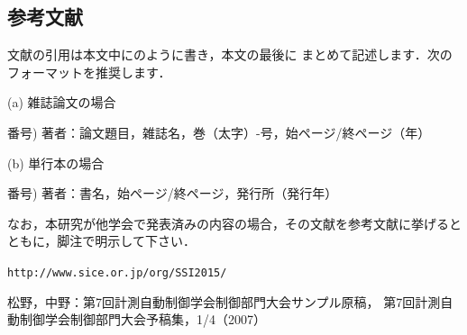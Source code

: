 \documentclass{jarticle}
\begin{document}
\subsection{参考文献}

文献の引用は本文中に\cite{大会ホームページ}のように書き，本文の最後に
まとめて記述します．次のフォーマットを推奨します．

\noindent
(a) 雑誌論文の場合

\noindent
番号)  著者：論文題目，雑誌名，巻（太字）-号，始ページ/終ページ（年）

\noindent
(b) 単行本の場合

\noindent
番号)  著者：書名，始ページ/終ページ，発行所（発行年）

なお，本研究が他学会で発表済みの内容の場合，その文献を参考文献に挙げるとともに，脚注で明示して下さい．

\small
\begin{thebibliography}{10}

{\tt http://www.sice.or.jp/org/SSI2015/}

松野，中野：第7回計測自動制御学会制御部門大会サンプル原稿，
第7回計測自動制御学会制御部門大会予稿集，1/4（2007）


\end{thebibliography}
\normalsize
\end{document}
